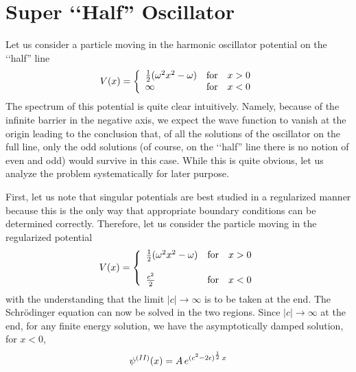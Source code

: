\documentclass[a4paper,11pt]{article}
\begin{document}
\section{Super \lq\lq Half'' Oscillator}

Let us consider a particle moving in the harmonic oscillator potential
on the \lq\lq half'' line
\begin{equation}
V(x) = \left\{\begin{array}{lll}
               {1\over 2}(\omega^{2}x^{2}-\omega)& {\rm for}& x>0\\
                \infty & {\rm for} & x<0
              \end{array}\right.\label{b1}
\end{equation}
The spectrum of this potential is quite clear intuitively. Namely,
because of the infinite barrier in the negative axis, we expect the
wave function to vanish at the
origin leading to the conclusion that, of all the solutions of the
oscillator on the full line, only the odd solutions (of course, on
the \lq\lq half'' line there is no notion of even and odd) would survive in
this case. While this is quite obvious, let us analyze the problem
systematically for later purpose.

First, let us note that singular potentials are best studied in a
regularized manner because this is the only way that  appropriate
boundary conditions can be determined correctly. Therefore, let us
consider the particle moving in the
regularized potential
\begin{equation}
V(x) = \left\{\begin{array}{lll}
               {1\over 2}(\omega^{2}x^{2}-\omega)& {\rm for}& x>0\\
                  &   &\\
               {c^{2}\over 2} & {\rm for} & x<0
              \end{array}\right.\label{b2}
\end{equation}
with the understanding that the limit $|c|\rightarrow\infty$ is to be
taken at the end. The Schr\"{o}dinger equation
can now be solved in the two regions. Since $|c|\rightarrow\infty$ at
the end, for any finite energy solution, we have the asymptotically
damped solution, for $x<0$,
\begin{equation}
\psi^{(II)}(x) = A\,e^{(c^{2} - 2\epsilon)^{{1\over 2}}\,x}\label{b3}
\end{equation}
\end{document}
